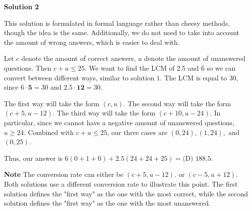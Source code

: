 \begin{enumerate}
\textbf{Solution 2}

This solution is formulated in formal language rather than cheesy methods, though the idea is the same. Additionally, we do not need to take into account the amount of wrong answers, which is easier to deal with.

 Let $c$ denote the amount of correct answers, $u$ denote the amount of unanswered questions. Then $c+u \leq 25.$ We want to find the LCM of $2.5$ and $6$ so we can convert between different ways, similar to solution $1.$ The LCM is equal to $30$, since $6 \cdot \textbf{5}=30$ and $2.5 \cdot \textbf{12}=30.$ 

 The first way will take the form $(c,u).$ The second way will take the form $(c+5, u-12).$ The third way will take the form $(c+10, u-24).$ In particular, since we cannot have a negative amount of unanswered questions, $u \geq 24.$ Combined with $c+u \leq 25$, our three cases are $(0,24), (1,24),$ and $(0,25).$

 Thus, our answer is $6(0+1+0) + 2.5(24+24+25)=\boxed {\text{(D) }188.5}.$

 \textbf{Note} The conversion rate can either be $(c+5, u-12).$ or $(c-5, u+12).$ Both solutions use a different conversion rate to illustrate this point. The first solution defines the "first way" as the one with the most correct, while the second solution defines the "first way" as the one with the most unanswered.

 


\end{enumerate}